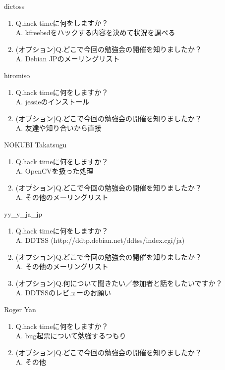 \begin{prework}{ dictoss }
  \begin{enumerate}
  \item Q.hack timeに何をしますか？\\
    A. kfreebsdをハックする内容を決めて状況を調べる
  \item (オプション)Q.どこで今回の勉強会の開催を知りましたか？\\
    A. Debian JPのメーリングリスト
  \end{enumerate}
\end{prework}

\begin{prework}{ hiromiso }
  \begin{enumerate}
  \item Q.hack timeに何をしますか？\\
    A. jessieのインストール
  \item (オプション)Q.どこで今回の勉強会の開催を知りましたか？\\
    A. 友達や知り合いから直接
  \end{enumerate}
\end{prework}

\begin{prework}{ NOKUBI Takatsugu }
  \begin{enumerate}
  \item Q.hack timeに何をしますか？\\
    A. OpenCVを扱った処理
  \item (オプション)Q.どこで今回の勉強会の開催を知りましたか？\\
    A. その他のメーリングリスト
  \end{enumerate}
\end{prework}

\begin{prework}{ yy\_y\_ja\_jp }
  \begin{enumerate}
  \item Q.hack timeに何をしますか？\\
    A. DDTSS (http://ddtp.debian.net/ddtss/index.cgi/ja)
  \item (オプション)Q.どこで今回の勉強会の開催を知りましたか？\\
    A. その他のメーリングリスト
  \item (オプション)Q.何について聞きたい／参加者と話をしたいですか？\\
    A. DDTSSのレビューのお願い
  \end{enumerate}
\end{prework}

\begin{prework}{ Roger Yan }
  \begin{enumerate}
  \item Q.hack timeに何をしますか？\\
    A. bug起票について勉強するつもり
  \item (オプション)Q.どこで今回の勉強会の開催を知りましたか？\\
    A. その他
  \end{enumerate}
\end{prework}

